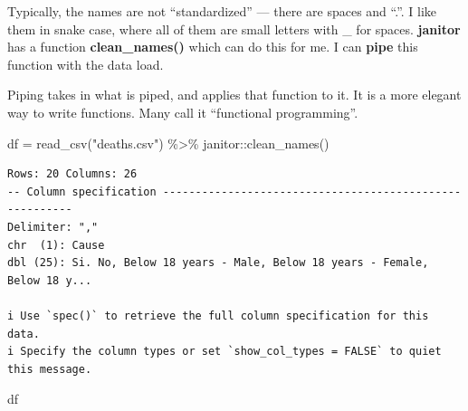\documentclass[
  letterpaper,
  DIV=11,
  numbers=noendperiod]{scrartcl}
\newenvironment{Shaded}{\begin{snugshade}}{\end{snugshade}}
\newcommand{\FunctionTok}[1]{\textcolor[rgb]{0.28,0.35,0.67}{#1}}
\newcommand{\NormalTok}[1]{\textcolor[rgb]{0.00,0.23,0.31}{#1}}
\newcommand{\OtherTok}[1]{\textcolor[rgb]{0.00,0.23,0.31}{#1}}
\newcommand{\SpecialCharTok}[1]{\textcolor[rgb]{0.37,0.37,0.37}{#1}}
\newcommand{\StringTok}[1]{\textcolor[rgb]{0.13,0.47,0.30}{#1}}
\begin{document}
Typically, the names are not ``standardized'' --- there are spaces and
``.''. I like them in snake case, where all of them are small letters
with \_ for spaces. \textbf{janitor} has a function
\textbf{clean\_names()} which can do this for me. I can \textbf{pipe}
this function with the data load.

Piping takes in what is piped, and applies that function to it. It is a
more elegant way to write functions. Many call it ``functional
programming''.

\begin{Shaded}
\begin{Highlighting}[]
\NormalTok{df }\OtherTok{=} \FunctionTok{read\_csv}\NormalTok{(}\StringTok{"deaths.csv"}\NormalTok{) }\SpecialCharTok{\%\textgreater{}\%} 
\NormalTok{   janitor}\SpecialCharTok{::}\FunctionTok{clean\_names}\NormalTok{()}
\end{Highlighting}
\end{Shaded}

\begin{verbatim}
Rows: 20 Columns: 26
-- Column specification --------------------------------------------------------
Delimiter: ","
chr  (1): Cause
dbl (25): Si. No, Below 18 years - Male, Below 18 years - Female, Below 18 y...

i Use `spec()` to retrieve the full column specification for this data.
i Specify the column types or set `show_col_types = FALSE` to quiet this message.
\end{verbatim}

\begin{Shaded}
\begin{Highlighting}[]
\NormalTok{df}
\end{Highlighting}
\end{Shaded}
\end{document}
